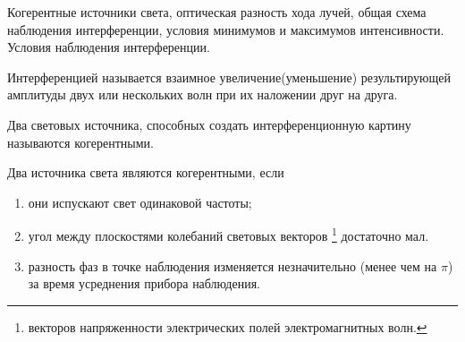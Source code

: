 ﻿\documentclass[__main__.tex]{subfiles}
\begin{document}
Когерентные источники света, оптическая разность хода лучей, общая схема наблюдения интерференции, условия минимумов и максимумов интенсивности. Условия наблюдения интерференции.\\ 

\begin{definition}
	Интерференцией называется взаимное увеличение(уменьшение) результирующей амплитуды двух или нескольких волн при их наложении друг на друга.
\end{definition}

\begin{definition}
	Два световых источника, способных создать интерференционную картину называются когерентными.
\end{definition}

\begin{theorem}
	Два источника света являются когерентными, если
	\begin{enumerate}
		\item они испускают свет одинаковой частоты;
		\item угол между плоскостями колебаний световых векторов
		\footnote{
			векторов напряженности электрических полей электромагнитных волн.
		}
		достаточно мал.
		\item разность фаз в точке наблюдения изменяется незначительно (менее чем на $\pi$) за время усреднения прибора наблюдения.
	\end{enumerate}
\end{theorem}
\end{document}
